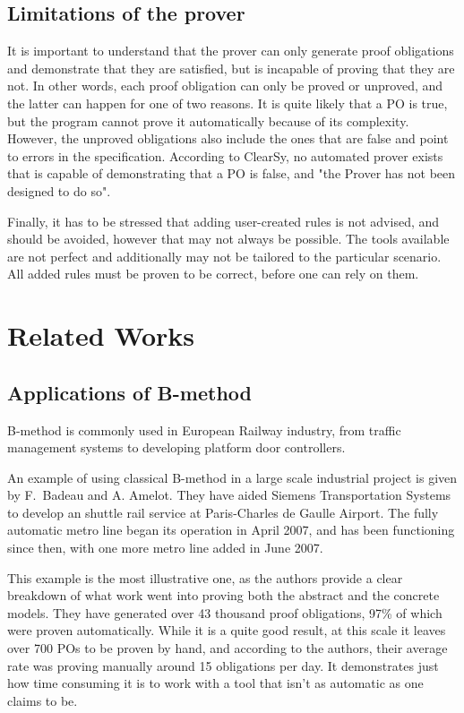 \documentclass[11pt,journal]{IEEEtran}
\begin{document}
	
	\subsection{Limitations of the prover}
	It is important to understand that the prover can only generate proof obligations and demonstrate that they are satisfied, but is incapable of proving that they are not. In other words, each proof obligation can only be proved or unproved, and the latter can happen for one of two reasons. It is quite likely that a PO is true, but the program cannot prove it automatically because of its complexity. However, the unproved obligations also include the ones that are false and point to errors in the specification. According to ClearSy, no automated prover exists that is capable of demonstrating that a PO is false, and "the Prover has not been designed to do so"\cite{Prover guide}.
	
	Finally, it has to be stressed that adding user-created rules is not advised, and should be avoided, however that may not always be possible. The tools available are not perfect and additionally may not be tailored to the particular scenario. All added rules must be proven to be correct, before one can rely on them.
	\section{Related Works}
	
	\subsection{Applications of B-method}
	B-method is commonly used in European Railway industry, from traffic management systems to developing platform door controllers\cite{Door controller}.
	
	An example of using classical B-method in a large scale industrial project is given by F.~Badeau and A. Amelot\cite{airport shuttle}. They have aided Siemens Transportation Systems to develop an shuttle rail service at Paris-Charles de Gaulle Airport. The fully automatic metro line began its operation in April 2007, and has been functioning since then, with one more metro line added in June 2007.
	
	This example is the most illustrative one, as the authors provide a clear breakdown of what work went into proving both the abstract and the concrete models. They have generated over 43 thousand proof obligations, 97\% of which were proven automatically. While it is a quite good result, at this scale it leaves over 700 POs to be proven by hand, and according to the authors, their average rate was proving manually around 15 obligations per day. It demonstrates just how time consuming it is to work with a tool that isn't as automatic as one claims to be.
	
\end{document}
